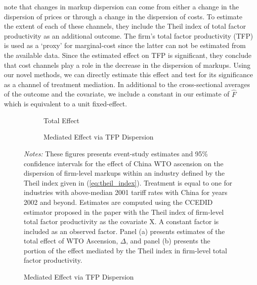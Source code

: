 \documentclass[12pt,fleqn]{article}
\makeatletter
\let\@@input
\makeatother
\begin{document}
\citet{lu2015trade} note that changes in markup dispersion can come from either a change in the dispersion of prices or through a change in the dispersion of costs. To estimate the extent of each of these channels, they include the Theil index of total factor productivity as an additional outcome. The firm's total factor productivity (TFP) is used as a `proxy' for marginal-cost since the latter can not be estimated from the available data. Since the estimated effect on TFP is significant, they conclude that cost channels play a role in the decrease in the dispersion of markups. Using our novel methods, we can directly estimate this effect and test for its significance as a channel of treatment mediation. In additional to the cross-sectional averages of the outcome and the covariate, we include a constant in our estimate of $\hat{F}$ which is equivalent to a unit fixed-effect. 

\begin{figure}
    \caption{China WTO Ascension and Markup Dispersion}
    \label{fig:trade}

    \begin{subfigure}[b]{\textwidth}
        \caption{Total Effect}
        
    \end{subfigure}
    
    \begin{subfigure}[b]{\textwidth}
        \caption{Mediated Effect via TFP Dispersion}
        
    \end{subfigure}
    
    {\footnotesize\emph{Notes:} These figures presents event-study estimates and 95\% confidence intervals for the effect of China WTO ascension on the dispersion of firm-level markups within an industry defined by the Theil index given in (\ref{eq:theil_index}). Treatment is equal to one for industries with above-median 2001 tariff rates with China for years 2002 and beyond. Estimates are computed using the CCEDID estimator proposed in the paper with the Theil index of firm-level total factor productivity as the covariate X. A constant factor is included as an observed factor. Panel (a) presents estimates of the total effect of WTO Ascension, $\Delta$, and panel (b) presents the portion of the effect mediated by the Theil index in firm-level total factor productivity.}
\end{figure}
\end{document}
